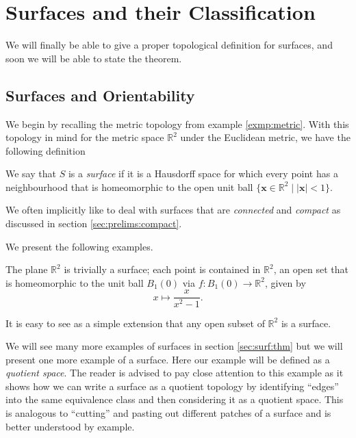 \section{Surfaces and their Classification}
\label{sec:surf}

We will finally be able to give a proper topological definition for
surfaces, and soon we will be able to state the theorem.

\subsection{Surfaces and Orientability}
\label{sec:surf:surfaces}

We begin by recalling the metric topology from example
\ref{exmp:metric}. With this topology in mind for the metric space
$\mathbb{R}^2$ under the Euclidean metric, we have the following
definition

\begin{defn}
  We say that $S$ is a \emph{surface} if it is a Hausdorff space for
  which every point has a neighbourhood that is homeomorphic to the
  open unit ball $\{\mathbf{x} \in \mathbb{R}^2 \mid \lvert \mathbf{x}
  \rvert < 1 \}$.
\end{defn}

We often implicitly like to deal with surfaces that are
\emph{connected} and \emph{compact} as discussed in section
\ref{sec:prelims:compact}.

We present the following examples.

\begin{exmp}
  The plane $\mathbb{R}^2$ is trivially a surface; each point is
  contained in $\mathbb{R}^2$, an open set that is homeomorphic to the
  unit ball $B_1(0)$ via $f:B_1(0) \rightarrow \mathbb{R}^2$, given by
  \[
    x \mapsto \frac{x}{x^2 - 1}.
  \]

  It is easy to see as a simple extension that any open subset of
  $\mathbb{R}^2$ is a surface.
\end{exmp}


We will see many more examples of surfaces in section
\ref{sec:surf:thm} but we will present one more example of a
surface. Here our example will be defined as a
\emph{quotient space}. The reader is advised to pay close attention to
this example as it shows how we can write a surface as a quotient
topology by identifying ``edges'' into the same equivalence class and
then considering it as a quotient space. This is analogous to
``cutting'' and pasting out different patches of a surface and is
better understood by example.

